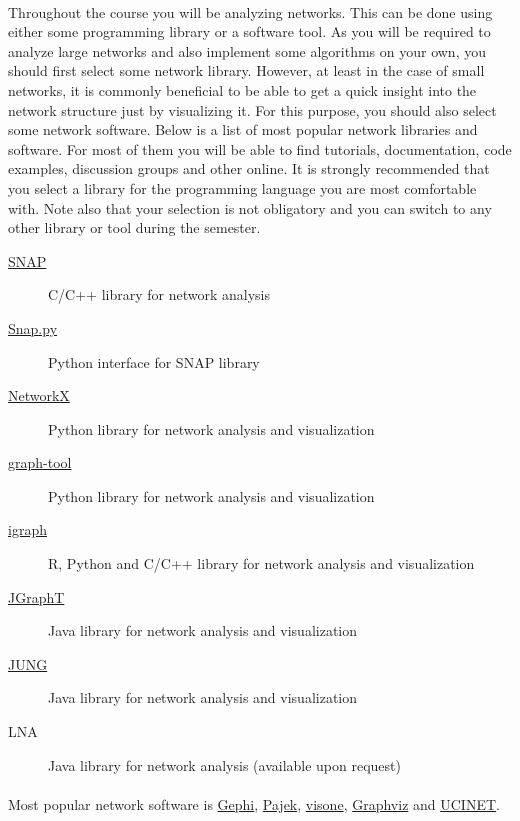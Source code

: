 \documentclass[11pt,a4paper]{article}
\begin{document}
\paragraph{} Throughout the course you will be analyzing networks. This can be done using either some programming library or a software tool. As you will be required to analyze large networks and also implement some algorithms on your own, you should first select some network library. However, at least in the case of small networks, it is commonly beneficial to be able to get a quick insight into the network structure just by visualizing it. For this purpose, you should also select some network software. Below is a list of most popular network libraries and software. For most of them you will be able to find tutorials, documentation, code examples, discussion groups and other online. It is strongly recommended that you select a library for the programming language you are most comfortable with. Note also that your selection is not obligatory and you can switch to any other library or tool during the semester.

\begin{description}
	\item[\href{http://snap.stanford.edu}{SNAP}] C/C++ library for network analysis
	\item[\href{https://snap.stanford.edu/snappy/}{Snap.py}] Python interface for SNAP library
	\item[\href{https://networkx.github.io}{NetworkX}] Python library for network analysis and visualization
	\item[\href{https://graph-tool.skewed.de}{graph-tool}] Python library for network analysis and visualization
	\item[\href{http://igraph.org}{igraph}] R, Python and C/C++ library for network analysis and visualization
	\item[\href{https://github.com/jgrapht/jgrapht}{JGraphT}] Java library for network analysis and visualization
	\item[\href{http://jung.sourceforge.net}{JUNG}] Java library for network analysis and visualization
	\item[LNA] Java library for network analysis (available upon request)
\end{description}

\paragraph{} Most popular network software is \href{http://gephi.github.io}{Gephi}, \href{http://mrvar.fdv.uni-lj.si/pajek/}{Pajek}, \href{http://visone.info}{visone}, \href{http://www.graphviz.org}{Graphviz} and \href{https://sites.google.com/site/ucinetsoftware/home}{UCINET}.
\end{document}
